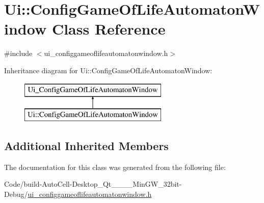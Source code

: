 \hypertarget{class_ui_1_1_config_game_of_life_automaton_window}{}\section{Ui\+:\+:Config\+Game\+Of\+Life\+Automaton\+Window Class Reference}
\label{class_ui_1_1_config_game_of_life_automaton_window}


{\ttfamily \#include $<$ui\+\_\+configgameoflifeautomatonwindow.\+h$>$}

Inheritance diagram for Ui\+:\+:Config\+Game\+Of\+Life\+Automaton\+Window\+:\begin{figure}[H]
\begin{center}
\leavevmode
\includegraphics[height=2.000000cm]{class_ui_1_1_config_game_of_life_automaton_window}
\end{center}
\end{figure}
\subsection*{Additional Inherited Members}


The documentation for this class was generated from the following file\+:\begin{DoxyCompactItemize}
\item 
Code/build-\/\+Auto\+Cell-\/\+Desktop\+\_\+\+Qt\+\_\+\_\+\_\+\_\+\+Min\+G\+W\+\_\+32bit-\/\+Debug/\mbox{\hyperlink{ui__configgameoflifeautomatonwindow_8h}{ui\+\_\+configgameoflifeautomatonwindow.\+h}}\end{DoxyCompactItemize}
